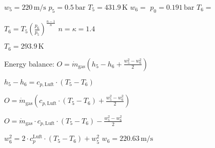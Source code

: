 \( w_5 = 220 \, \text{m/s} \)  
\( p_5 = 0.5 \, \text{bar} \)  
\( T_5 = 431.9 \, \text{K} \)  
\( w_6 = \)  
\( p_0 = 0.191 \, \text{bar} \)  
\( T_6 = \)  

\( T_6 = T_5 \left( \frac{p_6}{p_5} \right)^{\frac{n-1}{n}} \)  
\( n = \kappa = 1.4 \)  

\( T_6 = 293.9 \, \text{K} \)  

Energy balance:  
\( O = \dot{m}_{\text{gas}} \left( h_5 - h_6 + \frac{w_5^2 - w_6^2}{2} \right) \)  

\( h_5 - h_6 = c_{p,\text{Luft}} \cdot \left( T_5 - T_6 \right) \)  

\( O = \dot{m}_{\text{gas}} \left( c_{p,\text{Luft}} \cdot \left( T_5 - T_6 \right) + \frac{w_5^2 - w_6^2}{2} \right) \)  

\( O = \dot{m}_{\text{gas}} \cdot c_{p,\text{Luft}} \cdot \left( T_5 - T_6 \right) - \frac{w_5^2 - w_6^2}{2} \)

\( w_6^2 = 2 \cdot c_p^{\text{Luft}} \cdot (T_5 - T_6) + w_5^2 \)  
\( w_6 = 220.63 \, \text{m/s} \)